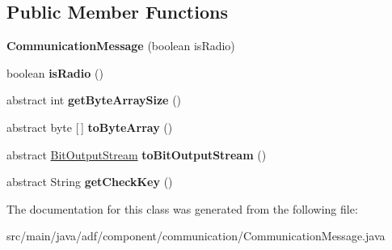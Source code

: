 \subsection*{Public Member Functions}
\begin{DoxyCompactItemize}
\item 
\hypertarget{classadf_1_1component_1_1communication_1_1CommunicationMessage_ac68a1589b60d7add1bde025ff02b64b3}{}\label{classadf_1_1component_1_1communication_1_1CommunicationMessage_ac68a1589b60d7add1bde025ff02b64b3} 
{\bfseries Communication\+Message} (boolean is\+Radio)
\item 
\hypertarget{classadf_1_1component_1_1communication_1_1CommunicationMessage_a353c19a8d7c6e052b1d50f580fe91cc6}{}\label{classadf_1_1component_1_1communication_1_1CommunicationMessage_a353c19a8d7c6e052b1d50f580fe91cc6} 
boolean {\bfseries is\+Radio} ()
\item 
\hypertarget{classadf_1_1component_1_1communication_1_1CommunicationMessage_a8d2694b5356bdd5126cc540b3f9f2f3a}{}\label{classadf_1_1component_1_1communication_1_1CommunicationMessage_a8d2694b5356bdd5126cc540b3f9f2f3a} 
abstract int {\bfseries get\+Byte\+Array\+Size} ()
\item 
\hypertarget{classadf_1_1component_1_1communication_1_1CommunicationMessage_a4b489e72be7259f0a61c1b85cce7f78b}{}\label{classadf_1_1component_1_1communication_1_1CommunicationMessage_a4b489e72be7259f0a61c1b85cce7f78b} 
abstract byte \mbox{[}$\,$\mbox{]} {\bfseries to\+Byte\+Array} ()
\item 
\hypertarget{classadf_1_1component_1_1communication_1_1CommunicationMessage_a35b04bf2a77eda6aba6070a02f4c26d3}{}\label{classadf_1_1component_1_1communication_1_1CommunicationMessage_a35b04bf2a77eda6aba6070a02f4c26d3} 
abstract \hyperlink{classadf_1_1component_1_1communication_1_1util_1_1BitOutputStream}{Bit\+Output\+Stream} {\bfseries to\+Bit\+Output\+Stream} ()
\item 
\hypertarget{classadf_1_1component_1_1communication_1_1CommunicationMessage_a64aef75735f3b938169ccc708a442dc0}{}\label{classadf_1_1component_1_1communication_1_1CommunicationMessage_a64aef75735f3b938169ccc708a442dc0} 
abstract String {\bfseries get\+Check\+Key} ()
\end{DoxyCompactItemize}


The documentation for this class was generated from the following file\+:\begin{DoxyCompactItemize}
\item 
src/main/java/adf/component/communication/Communication\+Message.\+java\end{DoxyCompactItemize}
